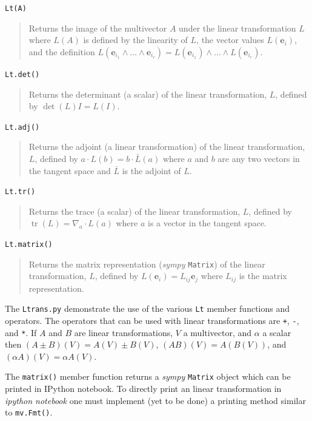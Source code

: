 \documentclass[12pt]{report}
\newcommand{\bm}[1]{\boldsymbol{#1}}
\newcommand{\ebf}{\bm{e}}
\newcommand{\lp}{\left (}
\newcommand{\rp}{\right )}
\newcommand{\W}{\wedge}
\newcommand{\f}[2]{{#1}\lp {#2} \rp}
\newcommand{\paren}[1]{\lp {#1} \rp}
\newcommand{\T}[1]{\texttt{#1}}
\begin{document}
\T{Lt(A)}
\begin{quote}
    Returns the image of the multivector $A$ under the linear transformation $L$ where $\f{L}{A}$ is defined by the
    linearity of $L$, the vector values $\f{L}{\ebf_{i}}$, and the definition
    $\f{L}{\ebf_{i_{1}}\W\dots\W\ebf_{i_{r}}} = \f{L}{\ebf_{i_{1}}}\W\dots\W\f{L}{\ebf_{i_{r}}}$.
\end{quote}
\T{Lt.det()}
\begin{quote}
    Returns the determinant (a scalar) of the linear transformation, $L$, defined by $\f{\det}{L}I = \f{L}{I}$.
\end{quote}
\T{Lt.adj()}
\begin{quote}
    Returns the adjoint (a linear transformation) of the linear transformation, $L$, defined by $a\cdot\f{L}{b} = b\cdot\f{\bar{L}}{a}$ where
    $a$ and $b$ are any two vectors in the tangent space and $\bar{L}$ is the adjoint of $L$.
\end{quote}
\T{Lt.tr()}
\begin{quote}
    Returns the trace (a scalar) of the linear transformation, $L$, defined by
    $\f{\operatorname{tr}}{L}=\nabla_{a}\cdot\f{L}{a}$ where $a$ is a vector in the tangent space.
\end{quote}
\T{Lt.matrix()}
\begin{quote}
    Returns the matrix representation (\emph{sympy} \T{Matrix}) of the linear transformation, $L$, defined by
    $\f{L}{\ebf_{i}} = L_{ij}\ebf_{j}$ where $L_{ij}$ is the matrix representation.
\end{quote}
The \T{Ltrans.py} demonstrate the use of the various \T{Lt} member functions and operators. The operators that can be used with
linear transformations are \T{+}, \T{-}, and \T{*}. If $A$ and $B$ are linear transformations, $V$ a multivector, and $\alpha$ a
scalar then $\f{\paren{A\pm B}}{V} = \f{A}{V}\pm\f{B}{V}$, $\f{\paren{AB}}{V} = \f{A}{\f{B}{V}}$, and
$\f{\paren{\alpha A}}{V} = \alpha\f{A}{V}$.

The \T{matrix()} member function returns a \emph{sympy} \T{Matrix} object which can be printed in IPython notebook.  To directly print
an linear transformation in \emph{ipython notebook} one must implement (yet to be done) a printing method similar to \T{mv.Fmt()}.
\end{document}
